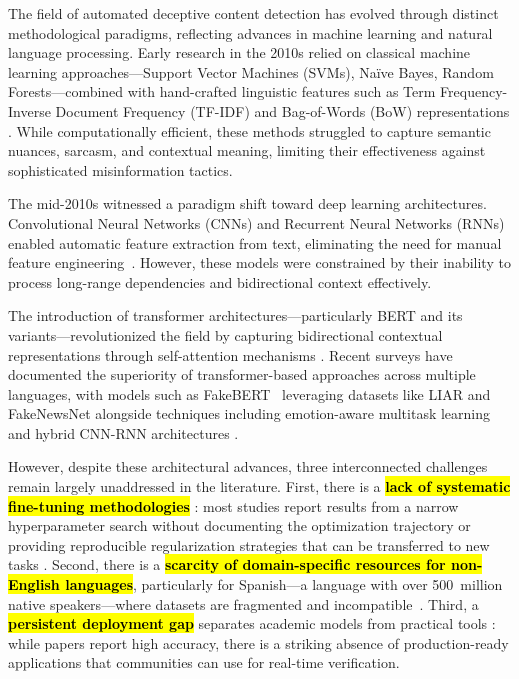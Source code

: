 \documentclass[informatics,article,accept,pdftex,moreauthors]{Definitions/mdpi}
\begin{document}
The field of automated deceptive content detection has evolved through distinct methodological paradigms, reflecting advances in machine learning and natural language processing.  Early research in the 2010s relied on classical machine learning approaches—Support Vector Machines (SVMs), Naïve Bayes, Random Forests—combined with hand-crafted linguistic features such as Term Frequency-Inverse Document Frequency (TF-IDF) and Bag-of-Words (BoW) representations \citep{shu2017fake, ali2022fake, perez2018automatic}. While computationally efficient, these methods struggled to capture semantic nuances, sarcasm, and contextual meaning, limiting their effectiveness against sophisticated misinformation tactics. 

The mid-2010s witnessed a paradigm shift toward deep learning architectures.  Convolutional Neural Networks (CNNs) and Recurrent Neural Networks (RNNs) enabled automatic feature extraction from text, eliminating the need for manual feature \mbox{engineering \citep{nasir2021fake, zhou2020survey}}. However, these models were constrained by their inability to process long-range dependencies and bidirectional context effectively. 

The introduction of transformer architectures—particularly BERT \citep{devlin2018bert} and its variants—revolutionized the field by capturing bidirectional contextual representations through self-attention mechanisms \citep{vaswani2017attention}. Recent surveys \citep{singh2024comprehensive, alghamdi2024comprehensive} have documented the superiority of transformer-based approaches across multiple languages, with models such as \mbox{FakeBERT \citep{kaliyar2021fakebert}} leveraging datasets like LIAR \citep{wang2017liar} and FakeNewsNet alongside techniques including emotion-aware multitask learning \citep{choudhry2024emotion} and hybrid CNN-RNN architectures \citep{nasir2021fake}. 

However, despite these architectural advances, three interconnected challenges remain largely unaddressed in the literature. First, there is a \textbf{\hl{lack of systematic fine-tuning methodologies}%
}: most studies report results from a narrow hyperparameter search without documenting the optimization trajectory or providing reproducible regularization strategies that can be transferred to new tasks \citep{blanco2024enhancing, martinez2021fake}. Second, there is a \textbf{\hl{scarcity of domain-specific resources for non-English languages}}, particularly for Spanish—a language with over \mbox{500 million} native speakers—where datasets are fragmented and \mbox{incompatible \citep{singh2024comprehensive, posadas2019detection}}. Third, a \textbf{\hl{persistent deployment gap}} separates academic models from practical tools \citep{ali2022fake}: while papers report high accuracy, there is a striking absence of production-ready applications that communities can use for real-time verification.
\end{document}
